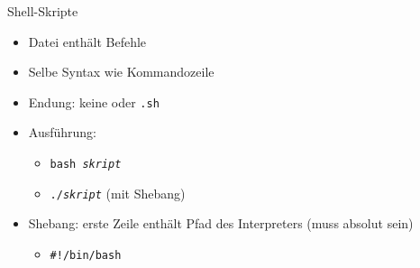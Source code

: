 \begin{frame}{Shell-Skripte}
  \begin{itemize}
    \item Datei enthält Befehle
    \item Selbe Syntax wie Kommandozeile
    \item Endung: keine oder \texttt{.sh}
    \item Ausführung:
      \begin{itemize}
        \item \texttt{bash \textit{skript}}
        \item \texttt{./\textit{skript}} (mit Shebang)
      \end{itemize}
    \item Shebang: erste Zeile enthält Pfad des Interpreters (muss absolut sein)
      \begin{itemize}
        \item \texttt{\#!/bin/bash}
      \end{itemize}
  \end{itemize}
\end{frame}
